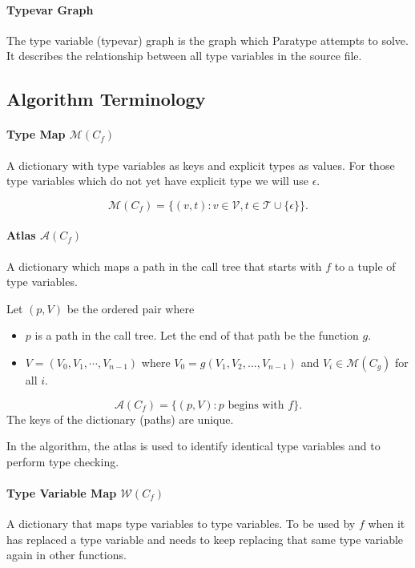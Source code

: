 \documentclass[10pt]{article}
\begin{document}
	\paragraph{Typevar Graph}
	The type variable (typevar) graph is the graph which Paratype attempts to
	solve. It describes the relationship between all type variables in the
	source file.
	
\subsection{Algorithm Terminology}
	\paragraph{Type Map $\mathcal{M}(C_f)$}
	A dictionary with type variables as keys and explicit types as values. For
	those type variables which do not yet have explicit type we will use
	$\epsilon$.
	
	\[
	\mathcal{M}(C_f) = \{ (v, t) : v \in \mathcal{V}, t \in \mathcal{T} \cup
	\{\epsilon\} \}.
	\]
	 
	\paragraph{Atlas $\mathcal{A}(C_f)$}
	A dictionary which maps a path in the call tree that starts with $f$ to a
	tuple of type variables.
	
	Let $(p, V)$ be the ordered pair where
	\begin{itemize}[noitemsep]
		\item $p$ is a path in the call tree. Let the end of that path be the
			function $g$.
		\item $V = (V_0, V_1, \cdots, V_{n-1})$ where $V_0 = g(V_{1}, V_{2},
			\ldots, V_{n-1})$ and $V_{i} \in \mathcal{M}(C_g)$ for all $i$.
	\end{itemize}
	\[
		\mathcal{A}(C_f) = \{ (p , V) : p\textrm{ begins with }f\}.
	\]
	The keys of the dictionary (paths) are unique.

	In the algorithm, the atlas is used to
	identify identical type variables and to perform type checking.

	\paragraph{Type Variable Map $\mathcal{W}(C_f)$}
	A dictionary that maps type variables to type variables. To be used by $f$
	when it has replaced a type variable and needs to keep replacing that same
	type variable again in other functions.
\end{document}
